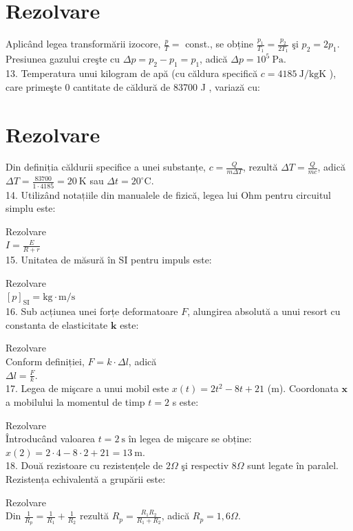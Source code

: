 \section*{Rezolvare}
Aplicând legea transformării izocore, $\frac{p}{T}=$ const., se obține $\frac{p_{1}}{T_{1}}=\frac{p_{2}}{2 T_{1}}$ şi $p_{2}=2 p_{1}$. Presiunea gazului creşte cu $\Delta p=p_{2}-p_{1}=p_{1}$, adică $\Delta p=10^{5} \mathrm{~Pa}$.\\
13. Temperatura unui kilogram de apă (cu căldura specifică $c=4185 \mathrm{~J} / \mathrm{kgK}$ ), care primeşte 0 cantitate de căldură de 83700 J , variază cu:

\section*{Rezolvare}
Din definiția căldurii specifice a unei substanțe, $c=\frac{Q}{m \Delta T}$, rezultă $\Delta T=\frac{Q}{m c}$, adică $\Delta T=\frac{83700}{1 \cdot 4185}=20 \mathrm{~K}$ sau $\Delta t=20^{\circ} \mathrm{C}$.\\
14. Utilizând notațiile din manualele de fizică, legea lui Ohm pentru circuitul simplu este:

Rezolvare\\
$I=\frac{E}{R+r}$\\
15. Unitatea de măsură în SI pentru impuls este:

Rezolvare\\
$[p]_{\mathrm{SI}}=\mathrm{kg} \cdot \mathrm{m} / \mathrm{s}$\\
16. Sub acțiunea unei forțe deformatoare $F$, alungirea absolută a unui resort cu constanta de elasticitate $\boldsymbol{k}$ este:

Rezolvare\\
Conform definiției, $F=k \cdot \Delta l$, adică\\
$\Delta l=\frac{F}{k}$.\\
17. Legea de mişcare a unui mobil este $x(t)=2 t^{2}-8 t+21$ (m). Coordonata $\boldsymbol{x}$ a mobilului la momentul de timp $t=2$ s este:

Rezolvare\\
Întroducând valoarea $t=2 \mathrm{~s}$ în legea de mişcare se obține:\\
$x(2)=2 \cdot 4-8 \cdot 2+21=13 \mathrm{~m}$.\\
18. Două rezistoare cu rezistențele de $2 \Omega$ şi respectiv $8 \Omega$ sunt legate în paralel. Rezistența echivalentă a grupării este:

Rezolvare\\
Din $\frac{1}{R_{p}}=\frac{1}{R_{1}}+\frac{1}{R_{2}}$ rezultă $R_{p}=\frac{R_{1} R_{2}}{R_{1}+R_{2}}$, adică $R_{p}=1,6 \Omega$.


